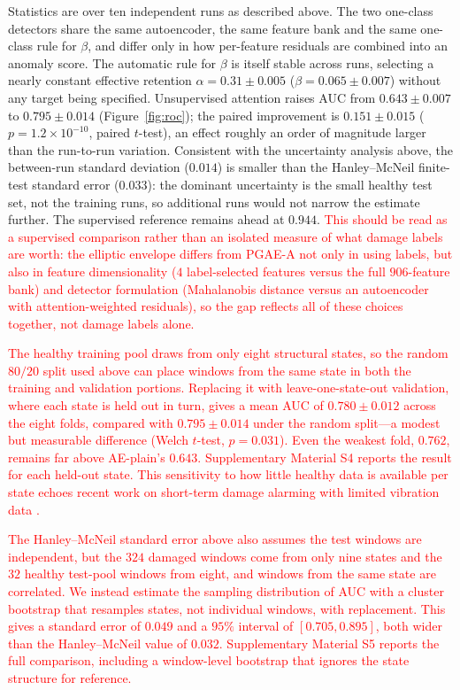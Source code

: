 \documentclass[11pt,a4paper]{article}
\begin{document}
Statistics are over ten independent runs as described above. The two one-class
detectors share the same autoencoder, the same feature bank and the same
one-class rule for $\beta$, and differ only in how per-feature residuals are
combined into an anomaly score. The automatic rule for $\beta$ is itself stable
across runs, selecting a nearly constant effective retention
$\alpha = 0.31 \pm 0.005$ ($\beta = 0.065 \pm 0.007$) without any target being
specified. Unsupervised attention raises AUC from
$0.643 \pm 0.007$ to $0.795 \pm 0.014$ (Figure~\ref{fig:roc}); the paired
improvement is
$0.151 \pm 0.015$ ($p = 1.2\times10^{-10}$, paired $t$-test), an effect roughly
an order of magnitude larger than the run-to-run variation. Consistent with
the uncertainty analysis above, the between-run standard deviation ($0.014$) is smaller than
the Hanley--McNeil finite-test standard error ($0.033$): the dominant
uncertainty is the small healthy test set, not the training runs, so
additional runs would not narrow the estimate further. The supervised
reference remains ahead at $0.944$.
\textcolor{red}{This should be read as a supervised comparison rather than an
isolated measure of what damage labels are worth: the elliptic envelope
differs from PGAE-A not only in using labels, but also in feature
dimensionality ($4$ label-selected features versus the full $906$-feature
bank) and detector formulation (Mahalanobis distance versus an autoencoder
with attention-weighted residuals), so the gap reflects all of these choices
together, not damage labels alone.}

\textcolor{red}{The healthy training pool draws from only eight structural
states, so the random $80/20$ split used above can place windows from the
same state in both the training and validation portions. Replacing it with
leave-one-state-out validation, where each state is held out in turn, gives
a mean AUC of $0.780 \pm 0.012$ across the eight folds, compared with
$0.795 \pm 0.014$ under the random split---a modest but measurable
difference (Welch $t$-test, $p=0.031$). Even the weakest fold, $0.762$,
remains far above AE-plain's $0.643$. Supplementary Material S4 reports the
result for each held-out state. This sensitivity to how little healthy data
is available per state echoes recent work on short-term damage alarming
with limited vibration data \cite{entezami2024measurement}.}

\textcolor{red}{The Hanley--McNeil standard error above also assumes the test windows are
independent, but the $324$ damaged windows come from only nine states and
the $32$ healthy test-pool windows from eight, and windows from the same
state are correlated. We instead estimate the sampling distribution of AUC
with a cluster bootstrap that resamples states, not individual windows, with
replacement. This gives a standard error of $0.049$ and a $95\%$ interval of
$[0.705, 0.895]$, both wider than the Hanley--McNeil value of $0.032$.
Supplementary Material S5 reports the full comparison, including a
window-level bootstrap that ignores the state structure for reference.}
\end{document}

